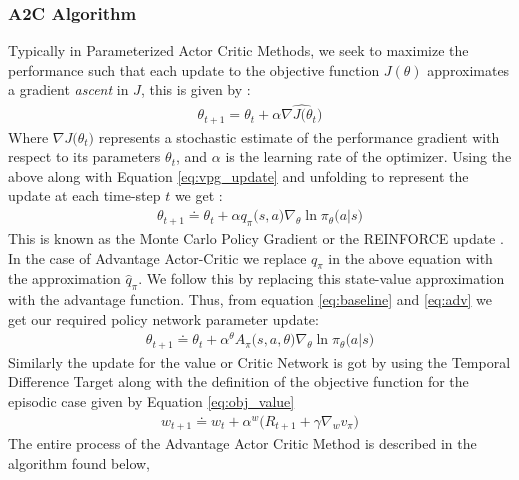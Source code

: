 \documentclass[12pt]{extarticle}
\numberwithin{equation}{section}
\begin{document}
	\subsubsection{A2C Algorithm}
	Typically in Parameterized Actor Critic Methods, we seek to maximize the performance such that each update to the objective function $J(\theta)$ approximates a gradient \textit{ascent} in $J$, this is given by :
	\begin{align}
	\theta_{t+1} =  	\theta_t + \alpha \widehat{\nabla J\big(\theta_t\big)}
	\end{align} 
	Where $\nabla J\big(\theta_t\big)$ represents a stochastic estimate of the performance gradient with respect to its parameters $\theta_t$, and $\alpha$ is the learning rate of the optimizer.
	Using the above along with Equation \ref{eq:vpg_update} and unfolding to represent the update at each time-step $t$ we get :
	\begin{align}
	\theta_{t+1} \doteq \theta_t +  \alpha q_{\pi}\big(s,a\big) \nabla_{\theta}\ln\pi_{\theta}\big(a|s\big)
	\end{align}
	This is known as the Monte Carlo Policy Gradient or the REINFORCE update \cite{Williams92REINFORCE}. In the case of Advantage Actor-Critic we replace $q_{\pi}$ in the above equation with the approximation $\hat{q}_{\pi}$. We follow this by replacing this state-value approximation with the advantage function. Thus, from equation \ref{eq:baseline} and \ref{eq:adv} we get our required policy network parameter update:
	\begin{align}
	\theta_{t+1} \doteq \theta_t +  \alpha^{\theta} A_{\pi}\big(s,a,\theta\big) \nabla_{\theta}\ln\pi_{\theta}\big(a|s\big)
	\end{align}
	Similarly the update for the value or Critic Network is got by using the Temporal Difference Target along with the definition of the objective function for the episodic case given by Equation \ref{eq:obj_value}\cite{Sutton-introRL}
	\begin{align}
	w_{t+1} \doteq w_t +  \alpha^{w}\big(R_{t+1} + \gamma\nabla_{w}v_{\pi}\big)  
	\end{align}
	The entire process of the Advantage Actor Critic Method is described in the algorithm found below,
\end{document}
